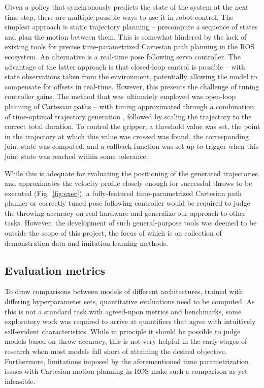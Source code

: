 \documentclass{article}
\begin{document}
Given a policy that synchronously predicts the state of the system at the next time step, there are multiple possible ways to use it in robot control. The simplest approach is static trajectory planning -- precompute a sequence of states and plan the motion between them. This is somewhat hindered by the lack of existing tools for precise time-parametrized Cartesian path planning in the ROS ecosystem. An alternative is a real-time pose following servo controller. The advantage of the latter approach is that closed-loop control is possible -- with state observations taken from the environment, potentially allowing the model to compensate for offsets in real-time. However, this presents the challenge of tuning controller gains. The method that was ultimately employed was open-loop planning of Cartesian paths -- with timing approximated through a combination of time-optimal trajectory generation \citep{kunz2012time}, followed by scaling the trajectory to the correct total duration. To control the gripper, a threshold value was set, the point in the trajectory at which this value was crossed was found, the corresponding joint state was computed, and a callback function was set up to trigger when this joint state was reached within some tolerance.

While this is adequate for evaluating the positioning of the generated trajectories, and approximates the velocity profile closely enough for successful throws to be executed (Fig.~\ref{fig:exec}), a fully-featured time-parametrized Cartesian path planner or correctly tuned pose-following controller would be required to judge the throwing accuracy on real hardware and generalize our approach to other tasks. However, the development of such general-purpose tools was deemed to be outside the scope of this project, the focus of which is on collection of demonstration data and imitation learning methods.

\subsection{Evaluation metrics}
\label{sec:eval}

To draw comparisons between models of different architectures, trained with differing hyperparameter sets, quantitative evaluations need to be computed. As this is not a standard task with agreed-upon metrics and benchmarks, some exploratory work was required to arrive at quantifiers that agree with intuitively self-evident characteristics. While in principle it should be possible to judge models based on throw accuracy, this is not very helpful in the early stages of research when most models fall short of attaining the desired objective. Furthermore, limitations imposed by the aforementioned time parametrization issues with Cartesian motion planning in ROS make such a comparison as yet infeasible.
\end{document}
